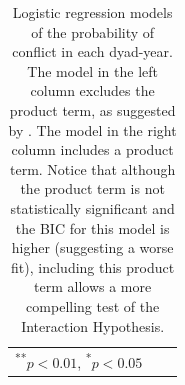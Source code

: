 \documentclass[12pt]{article}
\begin{document}
\begin{appendix}
\begin{table}[H]
\begin{center}
\begin{footnotesize}
\begin{tabular}{l c c }
{{  \textsuperscript{**}$p<0.01$, 
  \textsuperscript{*}$p<0.05$}}
\end{tabular}
\end{footnotesize}
\caption{Logistic regression models of the probability of conflict in each dyad-year. The model in the left column excludes the product term, as suggested by \cite{BerryDeMerittEsarey2010}. The model in the right column includes a product term. Notice that although the product term is not statistically significant and the BIC for this model is higher (suggesting a worse fit), including this product term allows a more compelling test of the Interaction Hypothesis.}
\label{tab:coefficients}
\end{center}
\end{table}


\end{appendix}
\end{document}
